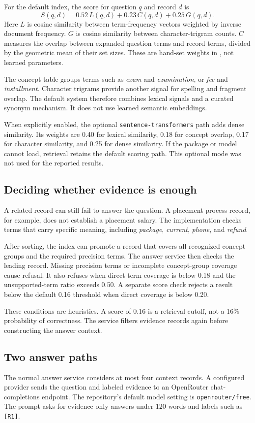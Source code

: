 \documentclass[11pt,a4paper]{article}
\newcommand{\file}[1]{\texttt{\detokenize{#1}}}
\begin{document}
For the default index, the score for question \(q\) and record \(d\) is
\[
S(q,d)=0.52\,L(q,d)+0.23\,C(q,d)+0.25\,G(q,d).
\]
Here \(L\) is cosine similarity between term-frequency vectors weighted by inverse document frequency. \(G\) is cosine similarity between character-trigram counts. \(C\) measures the overlap between expanded question terms and record terms, divided by the geometric mean of their set sizes. These are hand-set weights in \file{retrieval.py}, not learned parameters.

The concept table groups terms such as \textit{exam} and \textit{examination}, or \textit{fee} and \textit{installment}. Character trigrams provide another signal for spelling and fragment overlap. The default system therefore combines lexical signals and a curated synonym mechanism. It does not use learned semantic embeddings.

When explicitly enabled, the optional \texttt{sentence-transformers} path adds dense similarity. Its weights are 0.40 for lexical similarity, 0.18 for concept overlap, 0.17 for character similarity, and 0.25 for dense similarity. If the package or model cannot load, retrieval retains the default scoring path. This optional mode was not used for the reported results.

\subsection{Deciding whether evidence is enough}
A related record can still fail to answer the question. A placement-process record, for example, does not establish a placement salary. The implementation checks terms that carry specific meaning, including \textit{package}, \textit{current}, \textit{phone}, and \textit{refund}.

After sorting, the index can promote a record that covers all recognized concept groups and the required precision terms. The answer service then checks the leading record. Missing precision terms or incomplete concept-group coverage cause refusal. It also refuses when direct term coverage is below 0.18 and the unsupported-term ratio exceeds 0.50. A separate score check rejects a result below the default 0.16 threshold when direct coverage is below 0.20.

These conditions are heuristics. A score of 0.16 is a retrieval cutoff, not a 16\% probability of correctness. The service filters evidence records again before constructing the answer context.

\subsection{Two answer paths}
The normal answer service considers at most four context records. A configured provider sends the question and labeled evidence to an OpenRouter chat-completions endpoint. The repository's default model setting is \texttt{openrouter/free}. The prompt asks for evidence-only answers under 120 words and labels such as \texttt{[R1]}.
\end{document}
